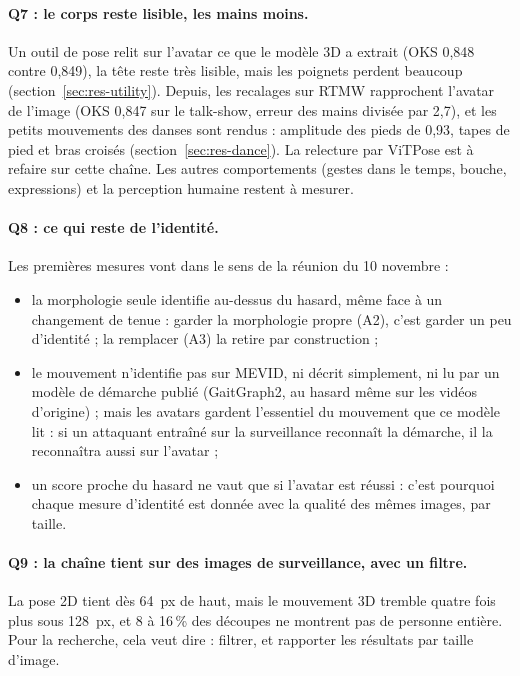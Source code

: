 \documentclass[11pt,a4paper]{report}
\begin{document}
\paragraph{Q7 : le corps reste lisible, les mains moins.} Un outil de pose relit sur l'avatar ce que le modèle 3D a extrait (OKS
0,848 contre 0,849), la tête reste très lisible, mais les poignets perdent beaucoup (section~\ref{sec:res-utility}). Depuis, les
recalages sur RTMW rapprochent l'avatar de l'image (OKS 0,847 sur le talk-show, erreur des mains divisée par 2,7), et les petits
mouvements des danses sont rendus : amplitude des pieds de 0,93, tapes de pied et bras croisés (section~\ref{sec:res-dance}). La
relecture par ViTPose est à refaire sur cette chaîne. Les autres comportements (gestes dans le temps, bouche, expressions) et la
perception humaine restent à mesurer.

\paragraph{Q8 : ce qui reste de l'identité.} Les premières mesures vont dans le sens de la réunion du 10 novembre :
\begin{itemize}
    \item la morphologie seule identifie au-dessus du hasard, même face à un changement de tenue : garder la morphologie propre (A2),
    c'est garder un peu d'identité ; la remplacer (A3) la retire par construction ;
    \item le mouvement n'identifie pas sur MEVID, ni décrit simplement, ni lu par un modèle de démarche publié (GaitGraph2, au
    hasard même sur les vidéos d'origine) ; mais les avatars gardent l'essentiel du mouvement que ce modèle lit : si un attaquant
    entraîné sur la surveillance reconnaît la démarche, il la reconnaîtra aussi sur l'avatar ;
    \item un score proche du hasard ne vaut que si l'avatar est réussi : c'est pourquoi chaque mesure d'identité est donnée avec la
    qualité des mêmes images, par taille.
\end{itemize}

\paragraph{Q9 : la chaîne tient sur des images de surveillance, avec un filtre.} La pose 2D tient dès 64~px de haut, mais le
mouvement 3D tremble quatre fois plus sous 128~px, et 8 à 16\,\% des découpes ne montrent pas de personne entière. Pour la
recherche, cela veut dire : filtrer, et rapporter les résultats par taille d'image.
\end{document}
